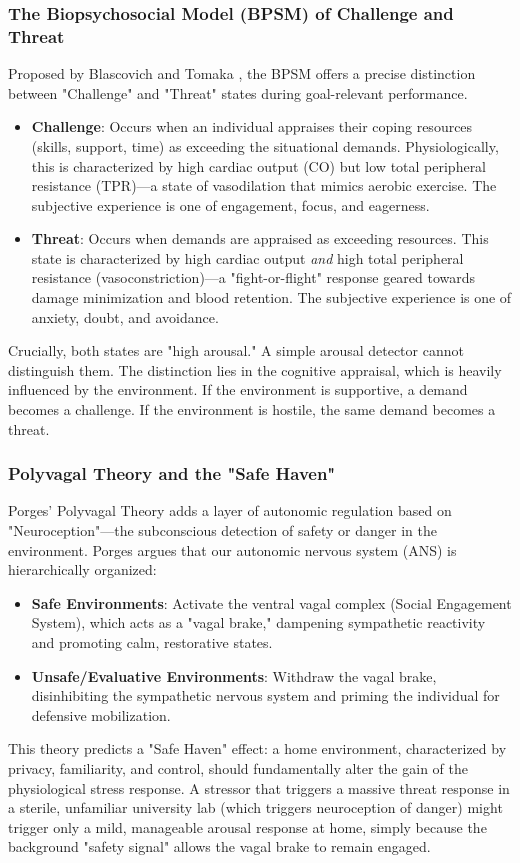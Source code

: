 \documentclass[journal]{IEEEtran}
\begin{document}
\subsubsection{The Biopsychosocial Model (BPSM) of Challenge and Threat}
Proposed by Blascovich and Tomaka \cite{biopsychosocial_model}, the BPSM offers a precise distinction between "Challenge" and "Threat" states during goal-relevant performance.
\begin{itemize}
    \item \textbf{Challenge}: Occurs when an individual appraises their coping resources (skills, support, time) as exceeding the situational demands. Physiologically, this is characterized by high cardiac output (CO) but low total peripheral resistance (TPR)—a state of vasodilation that mimics aerobic exercise. The subjective experience is one of engagement, focus, and eagerness.
    \item \textbf{Threat}: Occurs when demands are appraised as exceeding resources. This state is characterized by high cardiac output \textit{and} high total peripheral resistance (vasoconstriction)—a "fight-or-flight" response geared towards damage minimization and blood retention. The subjective experience is one of anxiety, doubt, and avoidance.
\end{itemize}
Crucially, both states are "high arousal." A simple arousal detector cannot distinguish them. The distinction lies in the cognitive appraisal, which is heavily influenced by the environment. If the environment is supportive, a demand becomes a challenge. If the environment is hostile, the same demand becomes a threat.

\subsubsection{Polyvagal Theory and the "Safe Haven"}
Porges' Polyvagal Theory \cite{polyvagal, porges_safe_haven} adds a layer of autonomic regulation based on "Neuroception"—the subconscious detection of safety or danger in the environment. Porges argues that our autonomic nervous system (ANS) is hierarchically organized:
\begin{itemize}
    \item \textbf{Safe Environments}: Activate the ventral vagal complex (Social Engagement System), which acts as a "vagal brake," dampening sympathetic reactivity and promoting calm, restorative states.
    \item \textbf{Unsafe/Evaluative Environments}: Withdraw the vagal brake, disinhibiting the sympathetic nervous system and priming the individual for defensive mobilization.
\end{itemize}
This theory predicts a "Safe Haven" effect: a home environment, characterized by privacy, familiarity, and control, should fundamentally alter the gain of the physiological stress response. A stressor that triggers a massive threat response in a sterile, unfamiliar university lab (which triggers neuroception of danger) might trigger only a mild, manageable arousal response at home, simply because the background "safety signal" allows the vagal brake to remain engaged.
\end{document}
